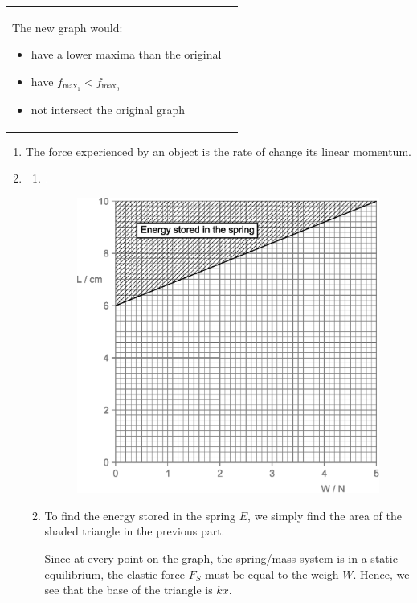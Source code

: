 \documentclass[11pt]{article}
\begin{document}
\begin{enumerate}[label={[D\arabic*]},itemsep={1em}]
\begin{enumerate}
{\begin{tabular}{p{8cm}r@{}}
							The new graph would:
							\begin{itemize}
								\item have a lower maxima than the original
								\item have $f_{\text{max}_1} < f_{\text{max}_0}$
								\item not intersect the original graph
							\end{itemize}
						\end{tabular}
					}
			\end{enumerate}
		\pagebreak[4]
		\item
			\begin{enumerate}
				\item The force experienced by an object is the rate of change its linear momentum.
				\item 
					\begin{enumerate}[label={(\roman*)}]
						\item \textcolor{white}{.}
							\begin{figure}[ht!]
								\vspace{-0.7cm}
								\centering
								\includegraphics[width=10cm]{D14bi.eps}
								\vspace{-0.4cm}
							\end{figure}
						\item To find the energy stored in the spring $E$, we simply find the area of the shaded triangle in the previous part. 
						
						Since at every point on the graph, the spring/mass system is in a static equilibrium, the elastic force $F_S$ must be equal to the weigh $W$. Hence, we see that the base of the triangle is $kx$.
						

\end{enumerate}
\end{enumerate}
\end{enumerate}
\end{document}
